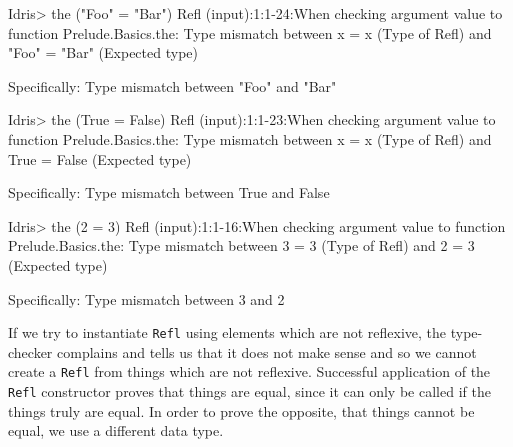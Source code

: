         \newpage
    
        \begin{code}[label={des:not-refl}, caption={Things that are not reflexive}, escapeinside={(*}{*)}]
        Idris> the ("Foo" = "Bar") Refl
        (input):1:1-24:When checking argument value to function
        Prelude.Basics.the:
            Type mismatch between
                x = x (Type of Refl)
            and
                "Foo" = "Bar" (Expected type)
        
            Specifically:
                Type mismatch between
                    "Foo"
                and
                    "Bar"
        
        
        Idris> the (True = False) Refl
        (input):1:1-23:When checking argument value to function
        Prelude.Basics.the:
            Type mismatch between
                x = x (Type of Refl)
            and
                True = False (Expected type)
        
            Specifically:
                Type mismatch between
                    True
                and
                    False
        
        
        Idris> the (2 = 3) Refl
        (input):1:1-16:When checking argument value to function
        Prelude.Basics.the:
            Type mismatch between
                3 = 3 (Type of Refl)
            and
                2 = 3 (Expected type)
            
            Specifically:
                Type mismatch between
                    3
                and
                    2
        \end{code}
        If we try to instantiate \texttt{Refl} using elements which are not reflexive, the type-checker complains and tells us that it does not make sense and so we cannot create a \texttt{Refl} from things which are not reflexive. Successful application of the \texttt{Refl} constructor proves that things are equal, since it can only be called if the things truly are equal. In order to prove the opposite, that things cannot be equal, we use a different data type.
    
